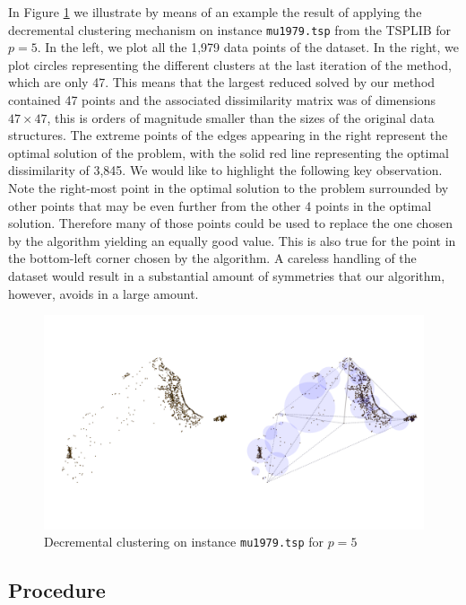 \documentclass[ijoo,nonblindrev]{informs-ijoo}
\begin{document}
In Figure \ref{fig:mu1979} we illustrate by means of an example the result of applying the decremental clustering mechanism on instance \texttt{mu1979.tsp} from the TSPLIB for $p = 5$. In the left, we plot all the 1,979 data points of the dataset. In the right, we plot circles representing the different clusters at the last iteration of the method, which are only 47. This means that the largest reduced \pDP{} solved by our method contained 47 points and the associated dissimilarity matrix was of dimensions $47\times 47$, this is orders of magnitude smaller than the sizes of the original data structures. The extreme points of the edges appearing in the right represent the optimal solution of the problem, with the solid red line representing the optimal dissimilarity of 3,845. We would like to highlight the following key observation. Note the right-most point in the optimal solution to the problem surrounded by other points that may be even further from the other 4 points in the optimal solution. Therefore many of those points could be used to replace the one chosen by the algorithm yielding an equally good value. This is also true for the point in the bottom-left corner chosen by the algorithm. A careless handling of the dataset would result in a substantial amount of symmetries that our algorithm, however, avoids in a large amount.

\begin{figure}[!hbtp]
	\centering
	\includegraphics[width=16cm]{mu1979.pdf}
	\caption{Decremental clustering on instance \texttt{mu1979.tsp}\label{fig:mu1979} for $p = 5$}
\end{figure}

\subsection{Procedure \label{section:decrclust:hpdp}}
\end{document}
